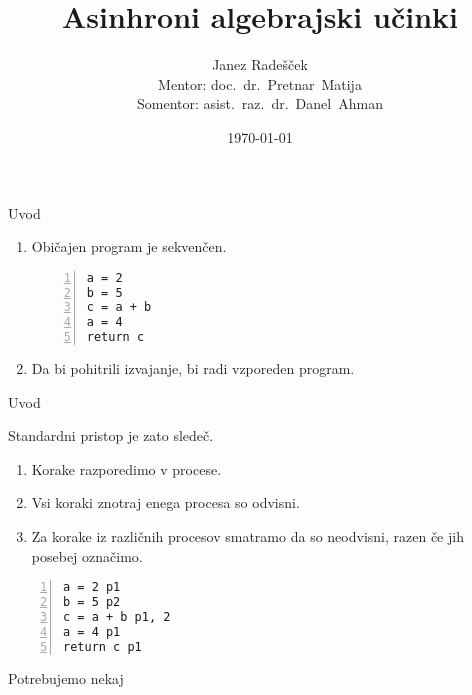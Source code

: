 \documentclass{beamer}
\theoremstyle{definition} %
\theoremstyle{plain} %
\begin{document}
	
	\title{Asinhroni algebrajski učinki}
	\author[Janez Radešček]{Janez Radešček \\[3mm] Mentor: doc.~dr.~Pretnar~Matija\\[3mm] Somentor: asist.~raz.~dr.~Danel~Ahman}
	\date{\today}
	
	\frame{\titlepage}
	
	
	
	
	\begin{frame}[fragile]{Uvod}
		\begin{enumerate}
			\item<1-> Običajen program je sekvenčen. 
			\begin{lstlisting}[numbers=left]
a = 2
b = 5
c = a + b
a = 4
return c
			\end{lstlisting}
			\item<2-> Da bi pohitrili izvajanje, bi radi vzporeden program.

		\end{enumerate}
		
		
		

		
	\end{frame}


\begin{frame}[fragile]{Uvod}
	
	Standardni pristop je zato sledeč.
	\begin{enumerate}
		\item Korake razporedimo v procese.
		\item Vsi koraki znotraj enega procesa so odvisni.
		\item Za korake iz različnih procesov smatramo da so neodvisni, razen če jih posebej označimo.
	\end{enumerate}
	
	\begin{lstlisting}[numbers=left]
a = 2 p1
b = 5 p2
c = a + b p1, 2 
a = 4 p1
return c p1
	\end{lstlisting}
	Potrebujemo nekaj
	
\end{frame}
\end{document}

